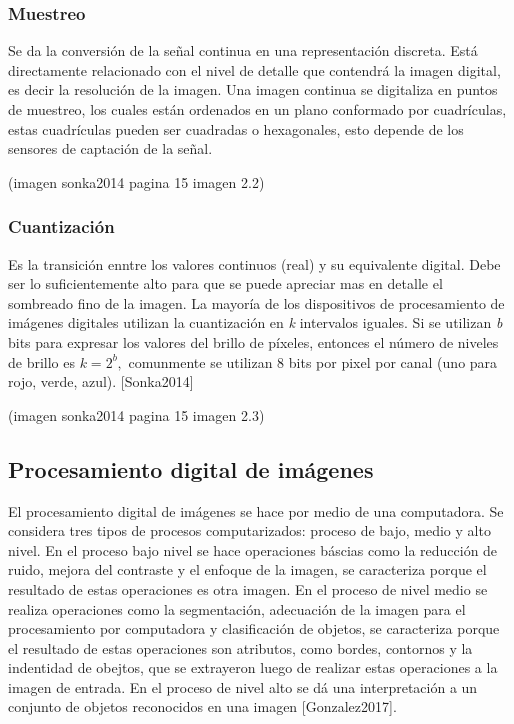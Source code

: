 \subsubsection{Muestreo}
Se da la conversión de la señal continua en una representación discreta. Está directamente relacionado con el nivel de detalle que contendrá la imagen digital, es decir la resolución de la imagen. Una imagen continua se digitaliza en puntos de muestreo, los cuales están ordenados en un plano conformado por cuadrículas, estas cuadrículas pueden ser cuadradas o hexagonales, esto depende de los sensores de captación de la señal.

(imagen sonka2014 pagina 15 imagen 2.2)

\subsubsection{Cuantización}
Es la transición enntre los valores continuos (real) y su equivalente digital. Debe ser lo suficientemente alto para que se puede apreciar mas en detalle el sombreado fino de la imagen.  La mayoría de los dispositivos de procesamiento de imágenes digitales utilizan la cuantización en \textit{k} intervalos iguales. Si se utilizan \textit{b} bits para expresar los valores del brillo de píxeles, entonces el número de niveles de brillo es \textit{$k = 2^{b},$} comunmente se utilizan 8 bits por pixel por canal (uno para rojo, verde, azul). [Sonka2014]

(imagen sonka2014 pagina 15 imagen 2.3)

\subsection{Procesamiento digital de imágenes}
El procesamiento digital de imágenes se hace por medio  de una computadora. Se considera tres tipos de procesos computarizados: proceso de bajo, medio y alto nivel. En el proceso bajo nivel se hace operaciones báscias como la reducción de ruido, mejora del contraste y el enfoque de la imagen, se caracteriza porque el resultado de estas operaciones es otra imagen. En el proceso de nivel medio se realiza operaciones como la segmentación, adecuación de la imagen para el procesamiento por computadora y clasificación de objetos, se caracteriza porque el resultado de estas operaciones son atributos, como bordes, contornos y la indentidad de obejtos, que se extrayeron luego de realizar estas operaciones a la imagen de entrada. En el proceso de nivel alto se dá una interpretación a un conjunto de objetos reconocidos en una imagen [Gonzalez2017].

